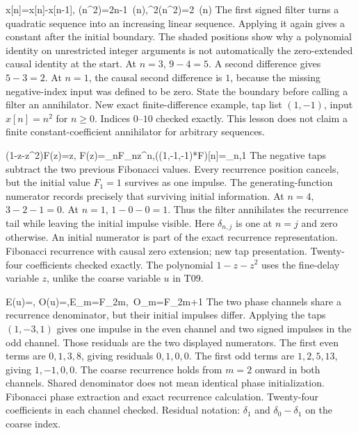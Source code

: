{\Delta x[n]=x[n]-x[n-1],\qquad
 \Delta(n^2)=2n-1\ (n),\quad \Delta^2(n^2)=2\ (n)}
{The first signed filter turns a quadratic sequence into an increasing linear sequence. Applying it again gives a constant after the initial boundary. The shaded positions show why a polynomial identity on unrestricted integer arguments is not automatically the zero-extended causal identity at the start.}
{At $n=3$, $9-4=5$. A second difference gives $5-3=2$. At $n=1$, the causal second difference is $1$, because the missing negative-index input was defined to be zero.}
{State the boundary before calling a filter an annihilator.}
{New exact finite-difference example, tap list $(1,-1)$, input $x[n]=n^2$ for $n\ge0$. Indices $0$--$10$ checked exactly. This lesson does not claim a finite constant-coefficient annihilator for arbitrary sequences.}

{(1-z-z^2)F(z)=z,\qquad
 F(z)=\sum_{n}F_nz^n,\qquad ((1,-1,-1)*F)[n]=\delta_{n,1}}
{The negative taps subtract the two previous Fibonacci values. Every recurrence position cancels, but the initial value $F_1=1$ survives as one impulse. The generating-function numerator records precisely that surviving initial information.}
{At $n=4$, $3-2-1=0$. At $n=1$, $1-0-0=1$. Thus the filter annihilates the recurrence tail while leaving the initial impulse visible. Here $\delta_{n,j}$ is one at $n=j$ and zero otherwise.}
{An initial numerator is part of the exact recurrence representation.}
{Fibonacci recurrence with causal zero extension; new tap presentation. Twenty-four coefficients checked exactly. The polynomial $1-z-z^2$ uses the fine-delay variable $z$, unlike the coarse variable $u$ in T09.}

{E(u)=,\qquad
 O(u)=,\qquad E_m=F_{2m},\ O_m=F_{2m+1}}
{The two phase channels share a recurrence denominator, but their initial impulses differ. Applying the taps $(1,-3,1)$ gives one impulse in the even channel and two signed impulses in the odd channel. Those residuals are the two displayed numerators.}
{The first even terms are $0,1,3,8$, giving residuals $0,1,0,0$. The first odd terms are $1,2,5,13$, giving $1,-1,0,0$. The coarse recurrence holds from $m=2$ onward in both channels.}
{Shared denominator does not mean identical phase initialization.}
{Fibonacci phase extraction and exact recurrence calculation. Twenty-four coefficients in each channel checked. Residual notation: $\delta_1$ and $\delta_0-\delta_1$ on the coarse index.}

